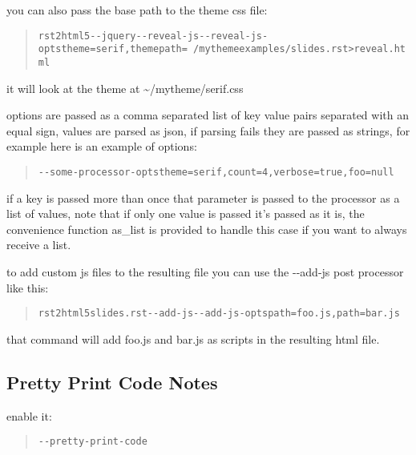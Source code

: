 \documentclass[a4paper]{article}
\begin{document}
you can also pass the base path to the theme css file:

\begin{quote}
\begin{alltt}
rst2html5 -{}-jquery -{}-reveal-js -{}-reveal-js-opts theme=serif,themepath=~/mytheme examples/slides.rst > reveal.html
\end{alltt}
\end{quote}

it will look at the theme at \textasciitilde{}/mytheme/serif.css

options are passed as a comma separated list of key value pairs separated with
an equal sign, values are parsed as json, if parsing fails they are passed as
strings, for example here is an example of options:

\begin{quote}
\begin{alltt}
-{}-some-processor-opts theme=serif,count=4,verbose=true,foo=null
\end{alltt}
\end{quote}

if a key is passed more than once that parameter is passed to the processor as a list of values, note that if only one value is passed it's passed as it is, the convenience function as\_list is provided to handle this case if you want to always receive a list.

to add custom js files to the resulting file you can use the -{}-add-js post processor like this:

\begin{quote}
\begin{alltt}
rst2html5 slides.rst -{}-add-js -{}-add-js-opts path=foo.js,path=bar.js
\end{alltt}
\end{quote}

that command will add foo.js and bar.js as scripts in the resulting html file.


\subsection{Pretty Print Code Notes%
  \label{pretty-print-code-notes}%
}

enable it:

\begin{quote}
\begin{alltt}
-{}-pretty-print-code
\end{alltt}
\end{quote}
\end{document}
